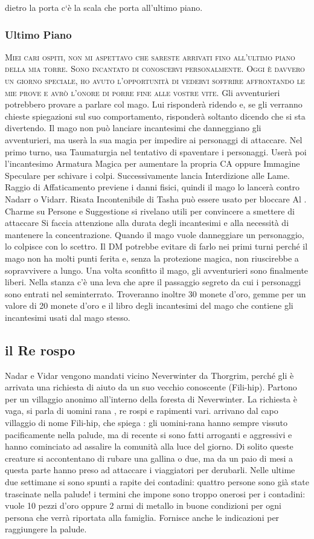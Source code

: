 \documentclass{article}
\begin{document}
    dietro la porta c`è la scala che porta all'ultimo piano.
            \subsubsection{Ultimo Piano}
\textsc{Miei cari ospiti, non mi aspettavo che sareste arrivati fino
all'ultimo piano della mia torre. Sono incantato di conoscervi
personalmente. Oggi è davvero un giorno speciale, ho avuto
l'opportunità di vedervi soffrire affrontando le mie prove e
avrò l'onore di porre fine alle vostre vite.}
Gli avventurieri
potrebbero provare a parlare col mago. Lui risponderà
ridendo e, se gli verranno chieste spiegazioni sul suo
comportamento, risponderà soltanto dicendo che si sta
divertendo.
Il mago non può lanciare incantesimi che danneggiano gli
avventurieri, ma userà la sua magia per impedire ai
personaggi di attaccare. Nel primo turno, usa Taumaturgia
nel tentativo di spaventare i personaggi.
Userà poi l'incantesimo Armatura Magica per aumentare la
propria CA oppure Immagine Speculare per schivare i colpi.
Successivamente lancia Interdizione alle Lame. Raggio di
Affaticamento previene i danni fisici, quindi il mago lo lancerà
contro Nadarr o Vidarr.
Risata Incontenibile di Tasha può essere usato per
bloccare Al . Charme su
Persone e Suggestione si rivelano utili per convincere a smettere di attaccare Si faccia attenzione alla durata degli incantesimi e alla
necessità di mantenere la concentrazione. Quando il mago
vuole danneggiare un personaggio, lo colpisce con lo scettro.
Il DM potrebbe evitare di farlo nei primi turni perché il mago
non ha molti punti ferita e, senza la protezione magica, non
riuscirebbe a sopravvivere a lungo.
Una volta sconfitto il mago, gli avventurieri sono
finalmente liberi. Nella stanza c'è una leva che apre il
passaggio segreto da cui i personaggi sono entrati nel
seminterrato. Troveranno inoltre 30 monete d'oro, gemme
per un valore di 20 monete d'oro e il libro degli incantesimi
del mago che contiene gli incantesimi usati dal mago stesso.

        \subsection{il Re rospo} Nadar e Vidar vengono mandati vicino Neverwinter da Thorgrim, perché gli è arrivata una richiesta di aiuto da un suo vecchio conoscente (Fili-hip). Partono per un villaggio anonimo all'interno della foresta di Neverwinter. La richiesta è vaga, si parla di uomini rana , re rospi e rapimenti vari.  arrivano dal capo villaggio di nome Fili-hip, che spiega : gli uomini-rana hanno sempre vissuto pacificamente nella palude, ma di recente si sono fatti arroganti e aggressivi e hanno cominciato ad assalire la comunità alla luce del giorno. Di solito queste creature si accontentano di rubare una gallina o due, ma da un paio di mesi a questa parte hanno preso ad attaccare i viaggiatori per derubarli. Nelle ultime due settimane si sono spunti a rapite dei contadini: quattro persone sono già state trascinate nella palude!  i termini che impone sono troppo onerosi per i contadini: vuole 10 pezzi d’oro oppure 2 armi di metallo in buone condizioni per ogni persona che verrà riportata alla famiglia. Fornisce anche le indicazioni per raggiungere la palude. 
\end{document}
